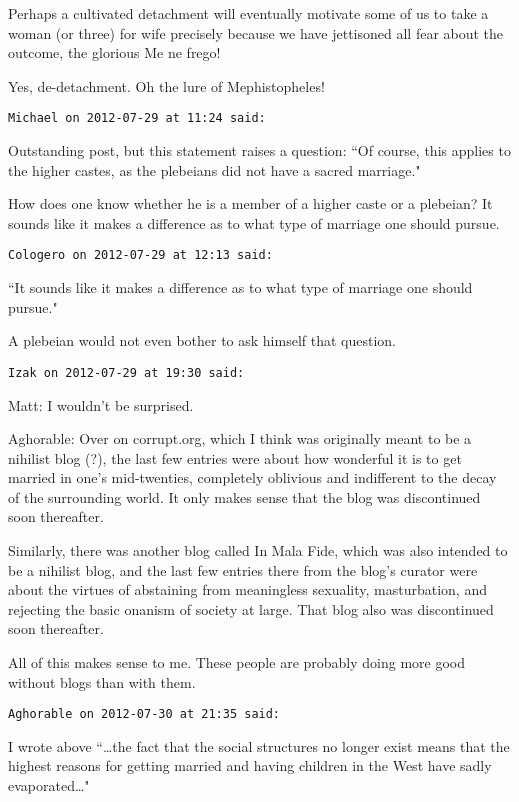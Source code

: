 \begin{footnotesize}
\begin{sffamily}
Perhaps a cultivated detachment will eventually motivate some of us to take a woman (or three) for wife precisely because we have jettisoned all fear about the outcome, the glorious Me ne frego! 

Yes, de-detachment. Oh the lure of Mephistopheles!


\hfill

\texttt{Michael on 2012-07-29 at 11:24 said: }

Outstanding post, but this statement raises a question: ``Of course, this applies to the higher castes, as the plebeians did not have a sacred marriage."

How does one know whether he is a member of a higher caste or a plebeian? It sounds like it makes a difference as to what type of marriage one should pursue.


\hfill

\texttt{Cologero on 2012-07-29 at 12:13 said: }

``It sounds like it makes a difference as to what type of marriage one should pursue."

A plebeian would not even bother to ask himself that question.


\hfill

\texttt{Izak on 2012-07-29 at 19:30 said: }

Matt: I wouldn't be surprised.

Aghorable: Over on corrupt.org, which I think was originally meant to be a nihilist blog (?), the last few entries were about how wonderful it is to get married in one's mid-twenties, completely oblivious and indifferent to the decay of the surrounding world. It only makes sense that the blog was discontinued soon thereafter. 

Similarly, there was another blog called In Mala Fide, which was also intended to be a nihilist blog, and the last few entries there from the blog's curator were about the virtues of abstaining from meaningless sexuality, masturbation, and rejecting the basic onanism of society at large. That blog also was discontinued soon thereafter.

All of this makes sense to me. These people are probably doing more good without blogs than with them.


\hfill

\texttt{Aghorable on 2012-07-30 at 21:35 said: }

I wrote above ``…the fact that the social structures no longer exist means that the highest reasons for getting married and having children in the West have sadly evaporated…"


\end{sffamily}
\end{footnotesize}
